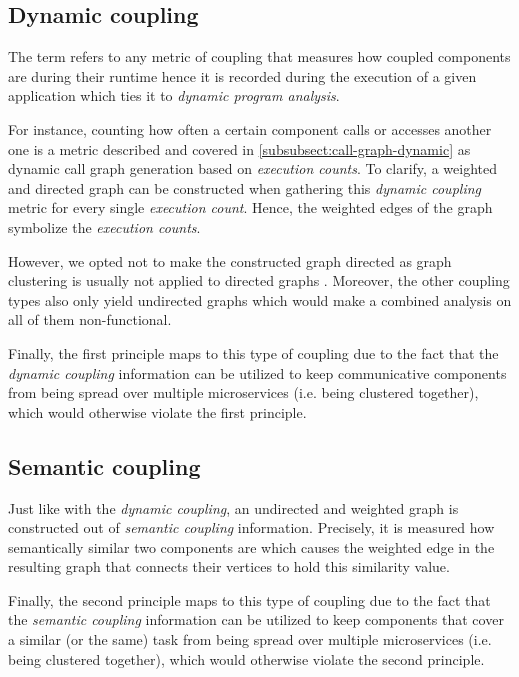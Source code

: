 \documentclass[12pt,a4paper]{report}
\begin{document}
\subsection{Dynamic coupling}

The term refers to any metric of coupling that measures how coupled
components are during their runtime hence it is recorded during the execution
of a given application which ties it to \textit{dynamic program analysis}.

For instance, counting how often a certain component calls or accesses another
one is a metric described and covered in \ref{subsubsect:call-graph-dynamic}
as dynamic call graph generation based on \textit{execution counts}.
To clarify, a weighted and directed graph can be constructed when gathering
this \textit{dynamic coupling} metric for every single \textit{execution count}.
Hence, the weighted edges of the graph symbolize the \textit{execution counts}.

However, we opted not to make the constructed graph directed as graph clustering
is usually not applied to directed graphs \cite{lancichinetti2009community}.
Moreover, the other coupling types also only yield undirected graphs which
would make a combined analysis on all of them non\hyp functional.

Finally, the first principle maps to this type of coupling due to the fact that
the \textit{dynamic coupling} information can be utilized to keep
communicative components from being spread over multiple microservices
(i.e. being clustered together), which would otherwise violate the first principle.


\subsection{Semantic coupling}

Just like with the \textit{dynamic coupling}, an undirected and weighted graph
is constructed out of \textit{semantic coupling} information.
Precisely, it is measured how semantically similar two components are which
causes the weighted edge in the resulting graph that connects their vertices
to hold this similarity value.

Finally, the second principle maps to this type of coupling due to the fact that
the \textit{semantic coupling} information can be utilized to keep
components that cover a similar (or the same) task from being spread over
multiple microservices (i.e. being clustered together),
which would otherwise violate the second principle.
\end{document}
